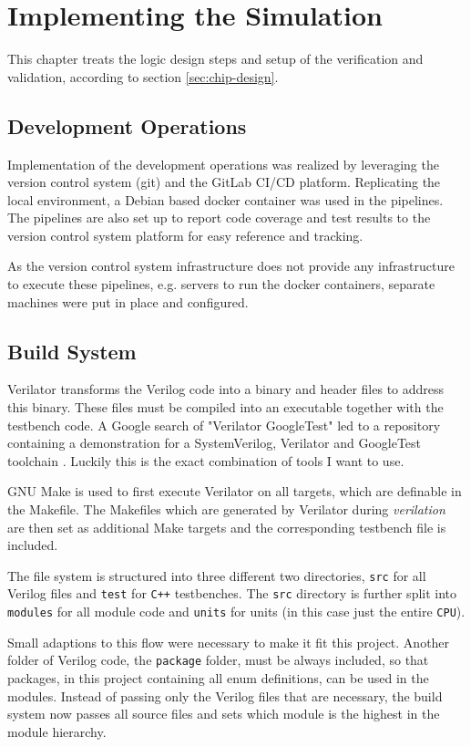 \chapter{Implementing the Simulation}
This chapter treats the logic design steps and setup of the verification and validation, according to section \ref{sec:chip-design}.

\section{Development Operations}
Implementation of the development operations was realized by leveraging the version control system (git) and the GitLab CI/CD platform. Replicating the local environment, a Debian based docker container \cite{dockerVerilator} was used in the pipelines. The pipelines are also set up to report code coverage and test results to the version control system platform for easy reference and tracking.

As the version control system infrastructure does not provide any infrastructure to execute these pipelines, e.g. servers to run the docker containers, separate machines were put in place and configured.

\section{Build System}
Verilator transforms the Verilog code into a binary and header files to address this binary. These files must be compiled into an executable together with the testbench code. A Google search of "Verilator GoogleTest" led to a repository containing a demonstration for a SystemVerilog, Verilator and GoogleTest toolchain \cite{toolchain}. Luckily this is the exact combination of tools I want to use. 

GNU Make is used to first execute Verilator on all targets, which are definable in the Makefile. The Makefiles which are generated by Verilator during \textit{verilation} are then set as additional Make targets and the corresponding testbench file is included.

The file system is structured into three different two directories, \texttt{src} for all Verilog files and \texttt{test} for \texttt{C++} testbenches. The \texttt{src} directory is further split into \texttt{modules} for all module code and \texttt{units} for units (in this case just the entire \texttt{CPU}).

Small adaptions to this flow were necessary to make it fit this project. Another folder of Verilog code, the \texttt{package} folder, must be always included, so that packages, in this project containing all enum definitions, can be used in the modules. Instead of passing only the Verilog files that are necessary, the build system now passes all source files and sets which module is the highest in the module hierarchy. 

